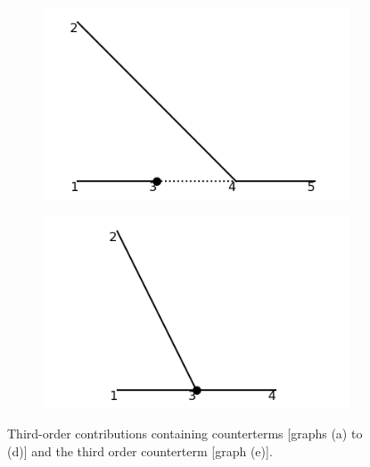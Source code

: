 \documentclass[11pt,a4paper,twoside,pdf]{article}
\numberwithin{equation}{section}
\begin{document}
\begin{figure}[h!]
\begin{subfigure}[t]{0.24\textwidth}
        \caption{ }
        \label{fig:order3_1to2/counterterms/4}
    \end{subfigure}
    \hfill
    \begin{subfigure}[t]{0.24\textwidth}
        \centering
        \includegraphics[width=\textwidth]{plots/order3/order3_1to2/counterterms/5.png}
        \caption{ }
        \label{fig:order3_1to2/counterterms/5}
    \end{subfigure}
    \hfill
    \centering
    \begin{subfigure}[t]{0.24\textwidth}
        \centering
        \includegraphics[width=\textwidth]{plots/order3/order3_1to2/counterterms/1.png}
        \caption{ }
    \end{subfigure}%
    \caption{Third-order contributions containing counterterms [graphs (a) to (d)] and the third order
    counterterm [graph (e)].}
    \label{fig:order3_1to2/counterterms}
\end{figure}
\end{document}
